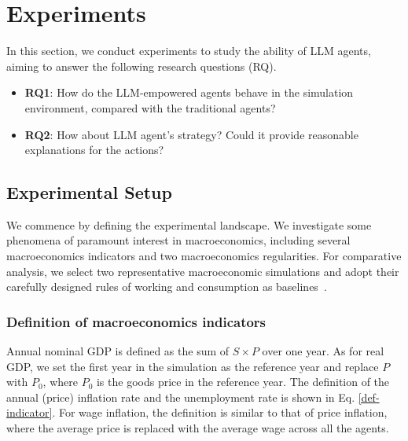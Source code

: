 
\section{Experiments}\label{sec::exp}
In this section, we conduct experiments to study the ability of LLM agents, aiming to answer the following research questions (RQ).
\begin{itemize}[leftmargin=*]
    \item \textbf{RQ1}: How do the LLM-empowered agents behave in the simulation environment, compared with the traditional agents?
    \item \textbf{RQ2}: How about LLM agent's strategy? Could it provide reasonable explanations for the actions?
\end{itemize}


\subsection{Experimental Setup}
We commence by defining the experimental landscape. We investigate some phenomena of paramount interest in macroeconomics, including several macroeconomics indicators and two macroeconomics regularities. For comparative analysis, we select two representative macroeconomic simulations and adopt their carefully designed rules of working and consumption as baselines~\cite{lengnick2013agent,gatti2011macroeconomics}.

\subsubsection{Definition of macroeconomics indicators} Annual nominal GDP is defined as the sum of $S\times P$ over one year. As for real GDP, we set the first year in the simulation as the reference year and replace $P$ with $P_0$, where $P_0$ is the goods price in the reference year. The definition of the annual (price) inflation rate and the unemployment rate is shown in Eq. \ref{def-indicator}. For wage inflation, the definition is similar to that of price inflation, where the average price is replaced with the average wage across all the agents.

